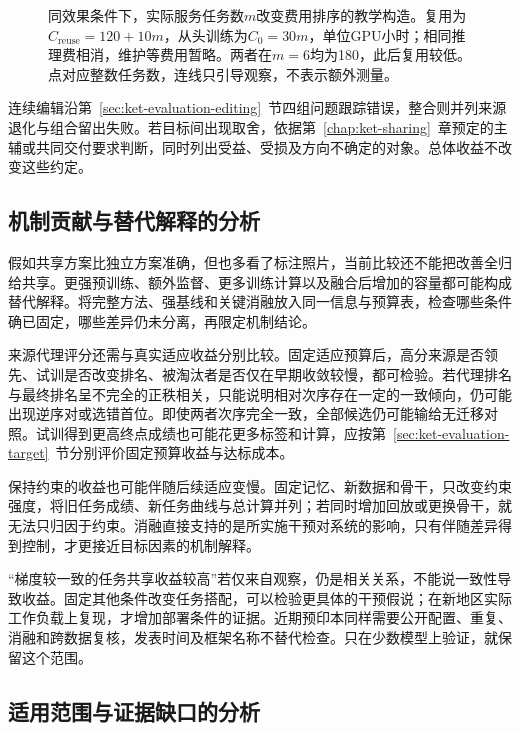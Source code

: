 \begin{figure}[htbp]
  \centering
  
  \caption{同效果条件下，实际服务任务数$m$改变费用排序的教学构造。复用为$C_{\mathrm{reuse}}=120+10m$，从头训练为$C_0=30m$，单位GPU小时；相同推理费相消，维护等费用暂略。两者在$m=6$均为180，此后复用较低。点对应整数任务数，连线只引导观察，不表示额外测量。}
  \label{fig:ket-evaluation-utility}
\end{figure}

连续编辑沿第~\ref{sec:ket-evaluation-editing}~节四组问题跟踪错误，整合则并列来源退化与组合留出失败。若目标间出现取舍，依据第~\ref{chap:ket-sharing}~章预定的主辅或共同交付要求判断，同时列出受益、受损及方向不确定的对象。总体收益不改变这些约定。

\subsection{机制贡献与替代解释的分析}
\label{sec:ket-evaluation-mechanisms}

假如共享方案比独立方案准确，但也多看了标注照片，当前比较还不能把改善全归给共享。更强预训练、额外监督、更多训练计算以及融合后增加的容量都可能构成替代解释。将完整方法、强基线和关键消融放入同一信息与预算表，检查哪些条件确已固定，哪些差异仍未分离，再限定机制结论。

来源代理评分还需与真实适应收益分别比较。固定适应预算后，高分来源是否领先、试训是否改变排名、被淘汰者是否仅在早期收敛较慢，都可检验。若代理排名与最终排名呈不完全的正秩相关，只能说明相对次序存在一定的一致倾向，仍可能出现逆序对或选错首位。即使两者次序完全一致，全部候选仍可能输给无迁移对照。试训得到更高终点成绩也可能花更多标签和计算，应按第~\ref{sec:ket-evaluation-target}~节分别评价固定预算收益与达标成本。

保持约束的收益也可能伴随后续适应变慢。固定记忆、新数据和骨干，只改变约束强度，将旧任务成绩、新任务曲线与总计算并列；若同时增加回放或更换骨干，就无法只归因于约束。消融直接支持的是所实施干预对系统的影响，只有伴随差异得到控制，才更接近目标因素的机制解释。

“梯度较一致的任务共享收益较高”若仅来自观察，仍是相关关系，不能说一致性导致收益。固定其他条件改变任务搭配，可以检验更具体的干预假说；在新地区实际工作负载上复现，才增加部署条件的证据。近期预印本同样需要公开配置、重复、消融和跨数据复核，发表时间及框架名称不替代检查。只在少数模型上验证，就保留这个范围。

\subsection{适用范围与证据缺口的分析}
\label{sec:ket-evaluation-limits}

